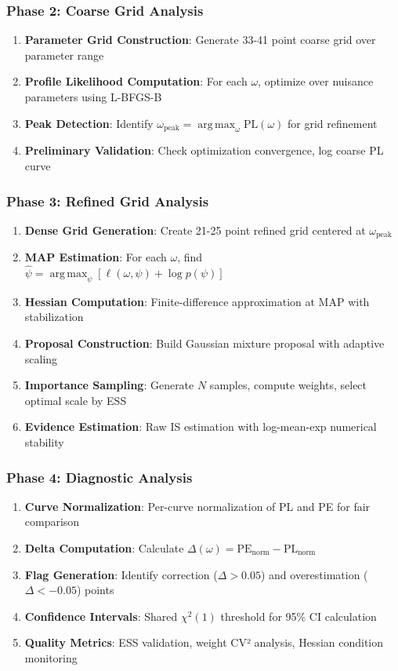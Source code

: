 \documentclass[conference]{IEEEtran}
\DeclareMathOperator*{\argmax}{arg\,max}
\begin{document}
\subsubsection{Phase 2: Coarse Grid Analysis}
\begin{enumerate}
\item \textbf{Parameter Grid Construction}: Generate 33-41 point coarse grid over parameter range
\item \textbf{Profile Likelihood Computation}: For each $\omega$, optimize over nuisance parameters using L-BFGS-B
\item \textbf{Peak Detection}: Identify $\omega_{\text{peak}} = \argmax_{\omega} \text{PL}(\omega)$ for grid refinement
\item \textbf{Preliminary Validation}: Check optimization convergence, log coarse PL curve
\end{enumerate}

\subsubsection{Phase 3: Refined Grid Analysis}
\begin{enumerate}
\item \textbf{Dense Grid Generation}: Create 21-25 point refined grid centered at $\omega_{\text{peak}}$
\item \textbf{MAP Estimation}: For each $\omega$, find $\hat{\psi} = \argmax_{\psi}[\ell(\omega,\psi) + \log p(\psi)]$
\item \textbf{Hessian Computation}: Finite-difference approximation at MAP with stabilization
\item \textbf{Proposal Construction}: Build Gaussian mixture proposal with adaptive scaling
\item \textbf{Importance Sampling}: Generate $N$ samples, compute weights, select optimal scale by ESS
\item \textbf{Evidence Estimation}: Raw IS estimation with log-mean-exp numerical stability
\end{enumerate}

\subsubsection{Phase 4: Diagnostic Analysis}
\begin{enumerate}
\item \textbf{Curve Normalization}: Per-curve normalization of PL and PE for fair comparison
\item \textbf{Delta Computation}: Calculate $\Delta(\omega) = \text{PE}_{\text{norm}} - \text{PL}_{\text{norm}}$
\item \textbf{Flag Generation}: Identify correction ($\Delta > 0.05$) and overestimation ($\Delta < -0.05$) points
\item \textbf{Confidence Intervals}: Shared $\chi^2(1)$ threshold for 95\% CI calculation
\item \textbf{Quality Metrics}: ESS validation, weight CV² analysis, Hessian condition monitoring
\end{enumerate}
\end{document}
